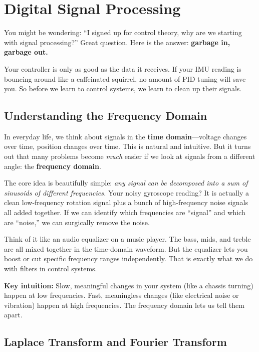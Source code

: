 \section{Digital Signal Processing}

You might be wondering: ``I signed up for control theory, why are we starting with signal processing?'' Great question. Here is the answer: \textbf{garbage in, garbage out.}

Your controller is only as good as the data it receives. If your IMU reading is bouncing around like a caffeinated squirrel, no amount of PID tuning will save you. So before we learn to control systems, we learn to clean up their signals.

\subsection{Understanding the Frequency Domain}

In everyday life, we think about signals in the \textbf{time domain}---voltage changes over time, position changes over time. This is natural and intuitive. But it turns out that many problems become \textit{much} easier if we look at signals from a different angle: the \textbf{frequency domain}.

The core idea is beautifully simple: \textit{any signal can be decomposed into a sum of sinusoids of different frequencies.} Your noisy gyroscope reading? It is actually a clean low-frequency rotation signal plus a bunch of high-frequency noise signals all added together. If we can identify which frequencies are ``signal'' and which are ``noise,'' we can surgically remove the noise.

Think of it like an audio equalizer on a music player. The bass, mids, and treble are all mixed together in the time-domain waveform. But the equalizer lets you boost or cut specific frequency ranges independently. That is exactly what we do with filters in control systems.

\textbf{Key intuition:} Slow, meaningful changes in your system (like a chassis turning) happen at low frequencies. Fast, meaningless changes (like electrical noise or vibration) happen at high frequencies. The frequency domain lets us tell them apart.

\subsection{Laplace Transform and Fourier Transform}

